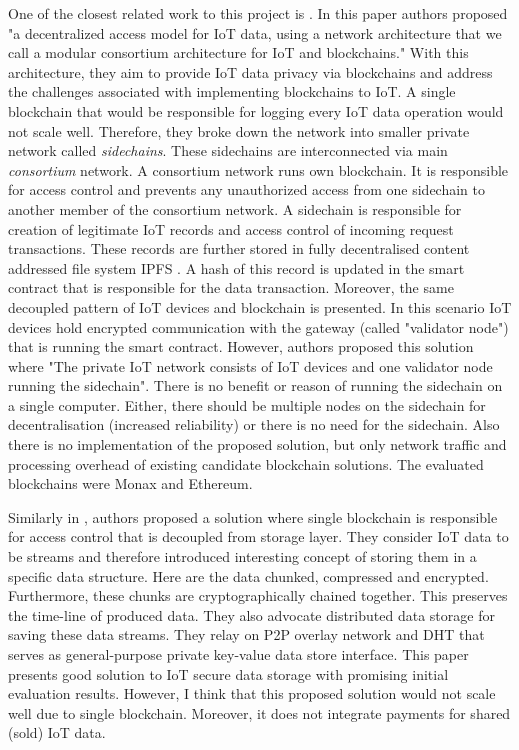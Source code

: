 One of the closest related work to this project is \cite{ali_iot_2017}. In this paper authors proposed "a decentralized access model for IoT data, using a network architecture that we call a modular consortium architecture for IoT and blockchains."
With this architecture, they aim to provide IoT data privacy via blockchains and address the challenges associated with implementing blockchains to IoT. A single blockchain that would be  responsible for logging every IoT data operation would not scale well. Therefore, they broke down the network into smaller private network called \textit{sidechains}. These sidechains are interconnected via main \textit{consortium} network. A consortium network runs own blockchain. It is responsible for access control and  prevents any unauthorized access from one sidechain to another member of the consortium network. A sidechain is responsible for creation of legitimate IoT records and access control of incoming request transactions. These records are further stored in fully decentralised content addressed file system IPFS \cite{labs_ipfs_nodate}. A hash of this record is updated in the smart contract that is responsible for the data transaction. Moreover, the same decoupled pattern of IoT devices and blockchain is presented. In this scenario IoT devices hold encrypted communication with the gateway (called "validator node") that is running the smart contract. However, authors proposed this solution where "The private IoT network consists of IoT devices and one validator node running the sidechain". There is no benefit or reason of running the sidechain on a single computer. Either, there should be multiple nodes on the sidechain for decentralisation (increased reliability) or there is no need for the sidechain. Also there is no implementation of the proposed solution, but only network traffic and processing overhead of existing candidate blockchain solutions. The evaluated blockchains were Monax and Ethereum.

Similarly in \cite{shafagh_towards_2017}, authors proposed a solution where single blockchain is responsible for access control that is decoupled from storage layer. They consider IoT data to be streams and therefore introduced interesting concept of storing them in a specific data structure. Here are the data chunked, compressed and encrypted. Furthermore, these chunks are cryptographically chained together. This preserves the time-line of produced  data. They also advocate distributed data storage for saving these data streams. They relay on P2P overlay network and DHT that serves as general-purpose private key-value data store interface. This paper presents good solution to IoT secure data storage with promising initial evaluation results. However, I think that this proposed solution would not scale well due to single blockchain. Moreover, it does not integrate payments for shared (sold) IoT data.


